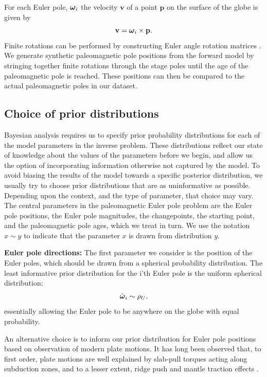 \documentclass[11pt,letterpaper]{article}
\newcommand{\mitbf}[1]{\hbox{\mathversion{bold}$#1$}}
\begin{document}
For each Euler pole, $\mitbf{\omega}_i$ the velocity $\mathbf{v}$ of a point $\mathbf{p}$ on the surface of the globe is given by
\begin{equation}
\mathbf{v} = \mitbf{\omega}_i \times \mathbf{p}.
\label{eq:rigid_rotation}
\end{equation}
Finite rotations can be performed by constructing Euler angle rotation matrices \citep[cf.][]{Goldstein1965a}.  We generate synthetic paleomagnetic pole positions from the forward model by stringing together finite rotations through the stage poles until the age of the paleomagnetic pole is reached. These positions can then be compared to the actual paleomagnetic poles in our dataset.

\subsection*{Choice of prior distributions}
\label{sec:priors}

Bayesian analysis requires us to specify prior probability distributions for each of the model parameters in the inverse problem. These distributions reflect our state of knowledge about the values of the parameters before we begin, and allow us the option of incorporating information otherwise not captured by the model. To avoid biasing the results of the model towards a specific posterior distribution, we usually try to choose prior distributions that are as uninformative as possible. Depending upon the context, and the type of parameter, that choice may vary. The central parameters in the paleomagnetic Euler pole problem are the Euler pole positions, the Euler pole magnitudes, the changepoints, the starting point, and the paleomagnetic pole ages, which we treat in turn. We use the notation $x \sim y$ to indicate that the parameter $x$ is drawn from distribution $y$.

\textbf{Euler pole directions:} 
The first parameter we consider is the position of the Euler poles, which should be drawn from a spherical probability distribution. The least informative prior distribution for the i'th Euler pole is the uniform spherical distribution:
\begin{equation}
\hat{\mitbf{\omega}}_i \sim \rho_U.
\end{equation}
essentially allowing the Euler pole to be anywhere on the globe with equal probability.

An alternative choice is to inform our prior distribution for Euler pole positions based on observation of modern plate motions. It has long been observed that, to first order, plate motions are well explained by slab-pull torques acting along subduction zones, and to a lesser extent, ridge push and mantle traction effects \citep{Forsyth1975a, Gordon1978a, Richardson1992a}. 
\end{document}
